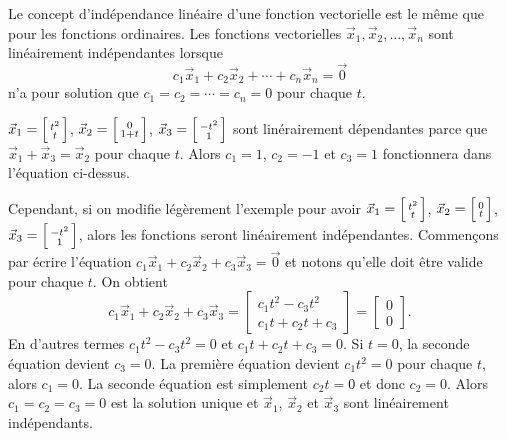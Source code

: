 Le concept d’indépendance linéaire d’une fonction vectorielle est le même que pour les fonctions ordinaires. Les fonctions vectorielles
$\vec{x}_1,\vec{x}_2,\ldots,\vec{x}_n$ sont linéairement indépendantes
lorsque
\begin{equation*}
c_1 \vec{x}_1 + c_2 \vec{x}_2 + \cdots + c_n \vec{x}_n  = \vec{0}
\end{equation*}
n’a pour solution que $c_1 = c_2 = \cdots = c_n = 0$ pour chaque $t$.

\begin{example}
$\vec{x}_1 = \Bigl[ \begin{smallmatrix} t^2 \\ t \end{smallmatrix} \Bigr]$,
$\vec{x}_2 = \Bigl[ \begin{smallmatrix} 0 \\ 1+t \end{smallmatrix} \Bigr]$,
$\vec{x}_3 = \Bigl[ \begin{smallmatrix} -t^2 \\ 1 \end{smallmatrix} \Bigr]$
sont linérairement dépendantes parce que
$\vec{x}_1 + \vec{x}_3 = \vec{x}_2$ pour chaque $t$. Alors $c_1 =
1$, $c_2 = -1$ et $c_3 = 1$ fonctionnera dans l’équation ci-dessus.

Cependant, si on modifie légèrement l’exemple pour avoir
$\vec{x}_1 = \Bigl[ \begin{smallmatrix} t^2 \\ t \end{smallmatrix} \Bigr]$,
$\vec{x}_2 = \Bigl[ \begin{smallmatrix} 0 \\ t \end{smallmatrix} \Bigr]$,
$\vec{x}_3 = \Bigl[ \begin{smallmatrix} -t^2 \\ 1 \end{smallmatrix}
\Bigr]$,
alors les fonctions seront linéairement indépendantes. Commençons par écrire l'équation
$c_1 \vec{x}_1 + c_2 \vec{x}_2 + c_3 \vec{x}_3  = \vec{0}$ et notons qu’elle doit être valide pour chaque $t$. On obtient
\begin{equation*}
c_1 \vec{x}_1 + c_2 \vec{x}_2 + c_3 \vec{x}_3
=
\begin{bmatrix}
c_1 t^2 - c_3 t^2
\\
c_1 t + c_2 t + c_3 
\end{bmatrix}
=
\begin{bmatrix}
0
\\
0
\end{bmatrix} .
\end{equation*}
En d’autres termes
$c_1 t^2 - c_3 t^2 = 0$ et
$c_1 t + c_2 t + c_3 = 0$.
Si $t = 0$, la seconde équation devient $c_3 = 0$. La première équation devient
$c_1 t^2 = 0$ pour chaque $t$, alors $c_1 = 0$.  La seconde équation est simplement $c_2 t = 0$ et donc $c_2 = 0$.  Alors $c_1 = c_2 = c_3 = 0$
est la solution unique et $\vec{x}_1$,
$\vec{x}_2$ et $\vec{x}_3$ sont linéairement indépendants.
\end{example}

